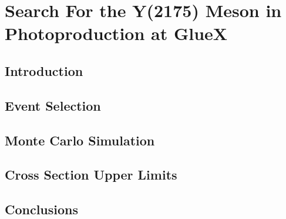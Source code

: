 \section{Search For the Y(2175) Meson in Photoproduction at GlueX}
\label{p4}
\vfill
\subsection{Introduction}
\vfill

\subsection{Event Selection}

\subsection{Monte Carlo Simulation}

\subsection{Cross Section Upper Limits}

\subsection{Conclusions}
